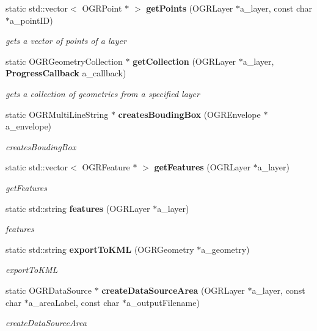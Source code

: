 \begin{DoxyCompactItemize}
static std\+::vector$<$ O\+G\+R\+Point $\ast$ $>$ {\bf get\+Points} (O\+G\+R\+Layer $\ast$a\+\_\+layer, const char $\ast$a\+\_\+point\+ID)
\begin{DoxyCompactList}\small\item\em gets a vector of points of a layer \end{DoxyCompactList}\item 
static O\+G\+R\+Geometry\+Collection $\ast$ {\bf get\+Collection} (O\+G\+R\+Layer $\ast$a\+\_\+layer, {\bf Progress\+Callback} a\+\_\+callback)
\begin{DoxyCompactList}\small\item\em gets a collection of geometries from a specified layer \end{DoxyCompactList}\item 
static O\+G\+R\+Multi\+Line\+String $\ast$ {\bf creates\+Bouding\+Box} (O\+G\+R\+Envelope $\ast$a\+\_\+envelope)
\begin{DoxyCompactList}\small\item\em creates\+Bouding\+Box \end{DoxyCompactList}\item 
static std\+::vector$<$ O\+G\+R\+Feature $\ast$ $>$ {\bf get\+Features} (O\+G\+R\+Layer $\ast$a\+\_\+layer)
\begin{DoxyCompactList}\small\item\em get\+Features \end{DoxyCompactList}\item 
static std\+::string {\bf features} (O\+G\+R\+Layer $\ast$a\+\_\+layer)
\begin{DoxyCompactList}\small\item\em features \end{DoxyCompactList}\item 
static std\+::string {\bf export\+To\+K\+ML} (O\+G\+R\+Geometry $\ast$a\+\_\+geometry)
\begin{DoxyCompactList}\small\item\em export\+To\+K\+ML \end{DoxyCompactList}\item 
static O\+G\+R\+Data\+Source $\ast$ {\bf create\+Data\+Source\+Area} (O\+G\+R\+Layer $\ast$a\+\_\+layer, const char $\ast$a\+\_\+area\+Label, const char $\ast$a\+\_\+output\+Filename)
\begin{DoxyCompactList}\small\item\em create\+Data\+Source\+Area \end{DoxyCompactList}\item 

\end{DoxyCompactItemize}
